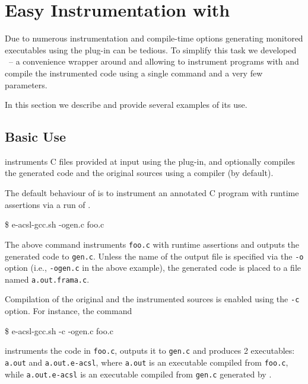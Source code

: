 \chapter{Easy Instrumentation with \eacsl}

Due to numerous instrumentation and compile-time options generating monitored
executables using the \eacsl plug-in can be tedious. To simplify this task we
developed \eacslgcc\ -- a convenience wrapper around \framac and \gcc allowing
to instrument programs with \eacsl and compile the instrumented code using a
single command and a very few parameters.

In this section we describe \eacslgcc and provide several examples of its use.


\section{Basic Use}

\eacslgcc instruments C files provided at input using the \eacsl plug-in, and
optionally compiles the generated code and the original sources using a \C
compiler (\gcc by default).

The default behaviour of \eacslgcc is to instrument an annotated C program
with runtime assertions via a run of \framac.

\begin{shell}
 \$ e-acsl-gcc.sh -ogen.c foo.c
\end{shell}

The above command instruments \texttt{foo.c} with runtime assertions and
outputs the generated code to \texttt{gen.c}. Unless the name of the output
file is specified via the \texttt{-o} option (i.e., \texttt{-ogen.c} in the
above example), the generated code is placed to a file named
\texttt{a.out.frama.c}.

Compilation of the original and the instrumented sources
is enabled using the \texttt{-c} option.  For instance, the command

\begin{shell}
 \$ e-acsl-gcc.sh -c -ogen.c foo.c
\end{shell}

instruments the code in \texttt{foo.c}, outputs it to \texttt{gen.c} and
produces 2 executables: \texttt{a.out} and \texttt{a.out.e-acsl}, where
\texttt{a.out} is an executable compiled from \texttt{foo.c}, while
\texttt{a.out.e-acsl} is an executable compiled from \texttt{gen.c} generated
by \eacsl.


